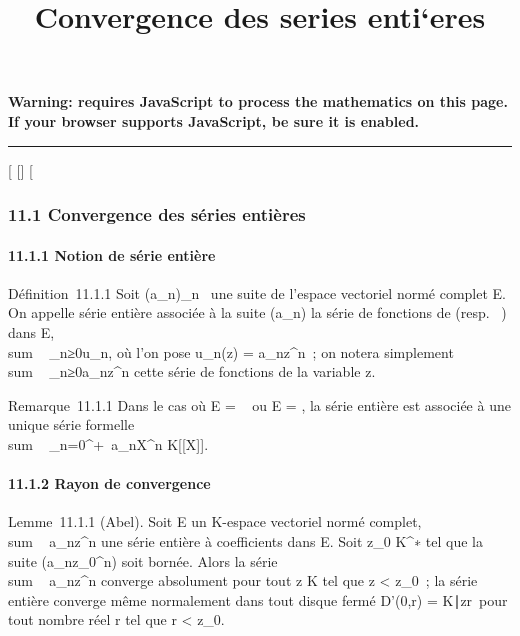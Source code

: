 \documentclass[]{article}
\title{Convergence des series enti`eres}
\author{}
\date{}
\begin{document}
\maketitle

\textbf{Warning: 
requires JavaScript to process the mathematics on this page.\\ If your
browser supports JavaScript, be sure it is enabled.}

\begin{center}\rule{3in}{0.4pt}\end{center}

{[}
{[}{]}
{[}

\subsubsection{11.1 Convergence des séries entières}

\paragraph{11.1.1 Notion de série entière}

Définition~11.1.1 Soit (a\_n)\_n\in{}~ une suite de l'espace
vectoriel normé complet E. On appelle série entière associée à la suite
(a\_n) la série de fonctions de  (resp. ~) dans E,
\\sum ~
\_n≥0u\_n, où l'on pose u\_n(z) =
a\_nz^n~; on notera simplement
\\sum ~
\_n≥0a\_nz^n cette série de fonctions de la
variable z.

Remarque~11.1.1 Dans le cas où E = ~ ou E = , la série entière est
associée à une unique série formelle
\\sum ~
\_n=0^+\infty~a\_nX^n \in K{[}{[}X{]}{]}.

\paragraph{11.1.2 Rayon de convergence}

Lemme~11.1.1 (Abel). Soit E un K-espace vectoriel normé complet,
\\sum ~
a\_nz^n une série entière à coefficients dans E. Soit
z\_0 \in K^∗ tel que la suite
(a\_nz\_0^n) soit bornée. Alors la série
\\sum ~
a\_nz^n converge absolument pour tout z \in K tel que
\textbar{}z\textbar{} \textless{} \textbar{}z\_0\textbar{}~; la
série entière converge même normalement dans tout disque fermé D'(0,r) =
\z \in
K∣\textbar{}z\textbar{}\leq r\
pour tout nombre réel r tel que r \textless{}
\textbar{}z\_0\textbar{}.
\end{document}
